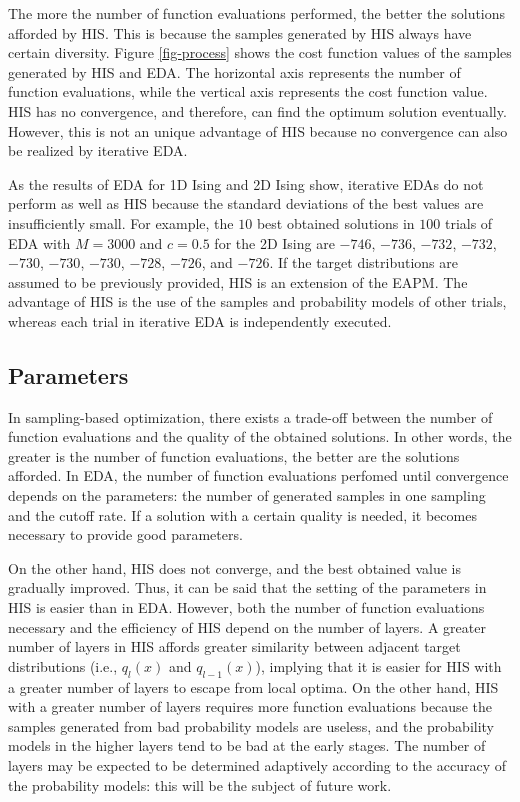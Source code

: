 The more the number of function evaluations performed, 
the better the solutions afforded by HIS. 
This is because the samples generated by HIS always have certain diversity.
Figure \ref{fig-process} shows
the cost function values of the samples generated by HIS and EDA.
The horizontal axis represents the number of function evaluations, while
the vertical axis represents the cost function value.
HIS has no convergence, and therefore, can find the optimum solution
eventually.
However, this is not an unique advantage of HIS
because no convergence can also be realized by iterative EDA.

As the results of EDA for 1D Ising and 2D Ising show,
iterative EDAs do not perform as well as HIS
because the standard deviations of the best values are insufficiently small.
For example, the $10$ best obtained solutions in $100$ trials
of EDA with $M=3000$ and $c=0.5$ for the 2D Ising 
are $-746$, $-736$, $-732$, $-732$, $-730$, $-730$, $-730$,
$-728$, $-726$, and  $-726$.
If the target distributions are assumed to be previously provided,
HIS is an extension of the EAPM.
The advantage of HIS
is the use of the samples and probability models of other trials, 
whereas each trial in iterative EDA is independently executed.

\subsection{Parameters}
In sampling-based optimization,
there exists a trade-off between
the number of function evaluations and 
the quality of the obtained solutions.
In other words,
the greater is the number of function evaluations,
the better are the solutions afforded.
In EDA, the number of function evaluations perfomed 
until convergence depends on
the parameters: the number of generated samples in one sampling and
the cutoff rate.
If a solution with a certain quality is needed,
it becomes necessary to provide good parameters.

On the other hand,
HIS does not converge, and
the best obtained value is gradually improved.
Thus, it can be said that the setting of the parameters in HIS
is easier than in EDA. 
However, both the number of function evaluations necessary and
the efficiency of HIS depend on the number of layers.
A greater number of layers in HIS
affords greater similarity 
between adjacent target distributions (i.e., $q_l(x)$ and
$q_{l-1}(x)$), implying that 
it is easier for HIS with a greater number of layers 
to escape from local optima.
On the other hand, HIS with a greater number of layers 
requires more function evaluations 
because the samples generated from bad probability models
are useless, and the probability models in the higher layers 
tend to be bad at the early stages.
The number of layers may be expected to be determined adaptively
according to the accuracy of the probability models:
this will be the subject of future work.

